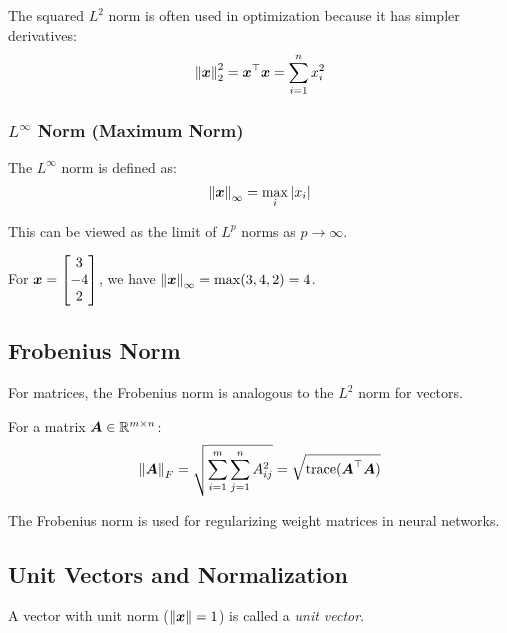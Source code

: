 The squared $L^2$ norm is often used in optimization because it has simpler derivatives:
\begin{equation}
    \left\lVert\boldsymbol{x}\right\rVert_2^2 = \boldsymbol{x}^\top\boldsymbol{x} = \sum_{i=1}^{n} x_i^2
\end{equation}

\subsubsection{$L^\infty$ Norm (Maximum Norm)}

The $L^\infty$ norm is defined as:
\begin{equation}
    \left\lVert\boldsymbol{x}\right\rVert_\infty = \max_i |x_i|
\end{equation}

This can be viewed as the limit of $L^p$ norms as $p \rightarrow \infty$.

\begin{example}
For $\boldsymbol{x} = \begin{bmatrix} 3 \\ -4 \\ 2 \end{bmatrix}$, we have $\left\lVert\boldsymbol{x}\right\rVert_\infty = \max(3, 4, 2) = 4$.
\end{example}

\subsection{Frobenius Norm}

For matrices, the Frobenius norm is analogous to the $L^2$ norm for vectors.

\begin{definition}
For a matrix $\boldsymbol{A} \in \mathbb{R}^{m \times n}$:
\begin{equation}
    \left\lVert\boldsymbol{A}\right\rVert_F = \sqrt{\sum_{i=1}^{m}\sum_{j=1}^{n} A_{ij}^2} = \sqrt{\text{trace}(\boldsymbol{A}^\top\boldsymbol{A})}
\end{equation}
\end{definition}

The Frobenius norm is used for regularizing weight matrices in neural networks.

\subsection{Unit Vectors and Normalization}

A vector with unit norm ($\left\lVert\boldsymbol{x}\right\rVert = 1$) is called a \emph{unit vector}.

